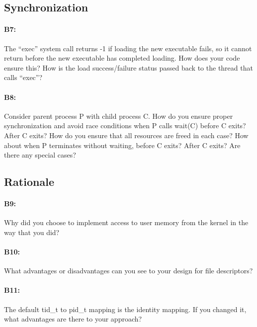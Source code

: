 \subsection{Synchronization}

\paragraph{B7:} %
The ``exec'' system call returns -1 if loading the new executable fails, so it cannot return before the new executable has completed loading.  How does your code ensure this?  How is the load success/failure status passed back to the thread that calls ``exec''?

\paragraph{B8:} %
Consider parent process P with child process C.  How do you ensure proper synchronization and avoid race conditions when P calls wait(C) before C exits?  After C exits?  How do you ensure that all resources are freed in each case?  How about when P terminates without waiting, before C exits?  After C exits?  Are there any special cases?

\subsection{Rationale}

\paragraph{B9:} %
Why did you choose to implement access to user memory from the kernel in the way that you did?

\paragraph{B10:} %
What advantages or disadvantages can you see to your design for file descriptors?

\paragraph{B11:} %
The default tid\_t to pid\_t mapping is the identity mapping. If you changed it, what advantages are there to your approach?
